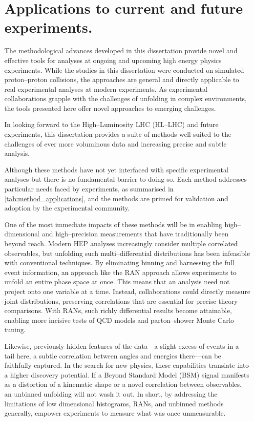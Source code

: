 \section{Applications to current and future experiments.}

    The methodological advances developed in this dissertation provide novel and effective tools for analyses at ongoing and upcoming high energy physics experiments.
    While the studies in this dissertation were conducted on simulated proton--proton collisions, the approaches are general and directly applicable to real experimental analyses at modern experiments.
    As experimental collaborations grapple with the challenges of unfolding in complex environments, the tools presented here offer novel approaches to emerging challenges.
    
    In looking forward to the High--Luminosity LHC (HL--LHC) and future experiments, this dissertation provides a suite of methods well suited to the challenges of ever more voluminous data and increasing precise and subtle analysis.
    
    Although these methods have not yet interfaced with specific experimental analyses but there is no fundamental barrier to doing so.
    Each method addresses particular needs faced by experiments, as summarised in \cref{tab:method_applications}, and the methods are primed for validation and adoption by the experimental community.
    

        One of the most immediate impacts of these methods will be in enabling {high--dimensional and high--precision measurements} that have traditionally been beyond reach.
        Modern HEP analyses increasingly consider multiple correlated observables, but unfolding such multi--differential distributions has been infeasible with conventional techniques.
        By eliminating binning and harnessing the full event information, an approach like the RAN approach allows experiments to unfold an entire phase space at once.
        This means that an analysis need not project onto one variable at a time.
        Instead, collaborations could directly measure joint distributions, preserving correlations that are essential for precise theory comparisons.
        With RANs, such richly differential results become attainable, enabling more incisive tests of QCD models and parton--shower Monte Carlo tuning.
        
        Likewise, previously hidden features of the data---a slight excess of events in a tail here, a subtle correlation between angles and energies there---can be faithfully captured.
        In the search for new physics, these capabilities translate into a higher discovery potential.
        If a Beyond Standard Model (BSM) signal manifests as a distortion of a kinematic shape or a novel correlation between observables, an unbinned unfolding will not wash it out.
        In short, by addressing the limitations of low dimensional histograms, RANs, and unbinned methods generally, empower experiments to measure what was once unmeasurable.
    
